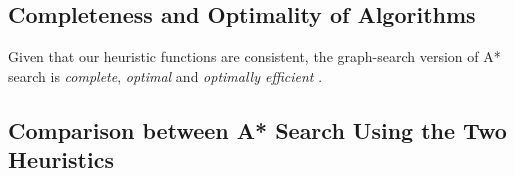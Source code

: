 \documentclass[11pt, a4paper]{article}
\theoremstyle{definition}
\begin{document}
\subsection{Completeness and Optimality of Algorithms}
Given that our heuristic functions are consistent, the graph-search version of A* search is \emph{complete}, \emph{optimal} and \emph{optimally efficient} \cite{russell_norvig_davis_2010}.

\subsection{Comparison between A* Search Using the Two Heuristics}



\end{document}
